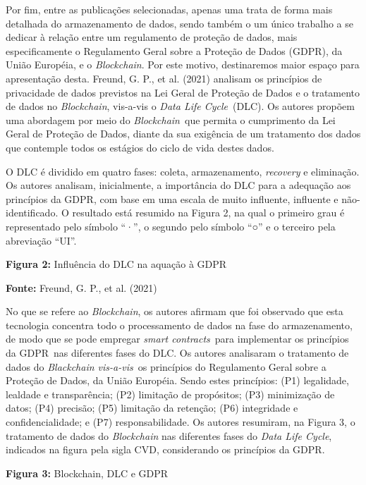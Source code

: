 Por fim, entre as publicações selecionadas, apenas uma trata de forma mais detalhada do armazenamento de dados, sendo também o um único trabalho a se dedicar à relação entre um regulamento de proteção de dados, mais especificamente o Regulamento Geral sobre a Proteção de Dados (GDPR), da União Européia, e o \textit{\textit{Blockchain}}. Por este motivo, destinaremos maior espaço para apresentação desta. Freund, G. P., et al. (2021) analisam os princípios de privacidade de dados previstos na Lei Geral de Proteção de Dados e o tratamento de dados no \textit{\textit{Blockchain}}, vis-a-vis o \textit{\textit{Data Life Cycle}} (DLC). Os autores propõem uma abordagem por meio do \textit{\textit{Blockchain}} que permita o cumprimento da Lei Geral de Proteção de Dados, diante da sua exigência de um tratamento dos dados que contemple todos os estágios do ciclo de vida destes dados. 

O DLC é dividido em quatro fases: coleta, armazenamento, \textit{\textit{recovery }}e eliminação. Os autores analisam, inicialmente, a importância do DLC para a adequação aos princípios da GDPR, com base em uma escala de muito influente, influente e não-identificado. O resultado está resumido na Figura 2, na qual o primeiro grau é representado pelo símbolo “·”, o segundo pelo símbolo “○” e o terceiro pela abreviação “UI”. 

 \textbf{\textbf{Figura 2: }}Influência do DLC na aquação à GDPR

 \textbf{\textbf{Fonte: }}Freund, G. P., et al. (2021)

 No que se refere ao \textit{\textit{Blockchain}}, os autores afirmam que foi observado que esta tecnologia concentra todo o processamento de dados na fase do armazenamento, de modo que se pode empregar \textit{\textit{smart contracts}} para implementar os princípios da GDPR nas diferentes fases do DLC. Os autores analisaram o tratamento de dados do \textit{\textit{Blackchain vis-a-vis}} os princípios do Regulamento Geral sobre a Proteção de Dados, da União Européia. Sendo estes princípios: (P1) legalidade, lealdade e transparência; (P2) limitação de propósitos; (P3) minimização de datos; (P4) precisão; (P5) limitação da retenção; (P6) integridade e confidencialidade; e (P7) responsabilidade. Os autores resumiram, na Figura 3, o tratamento de dados do \textit{\textit{Blockchain }}nas diferentes fases do \textit{\textit{Data Life Cycle}}, indicados na figura pela sigla CVD, considerando os princípios da GDPR.

 \textbf{\textbf{Figura 3: }}Blockchain, DLC e GDPR

